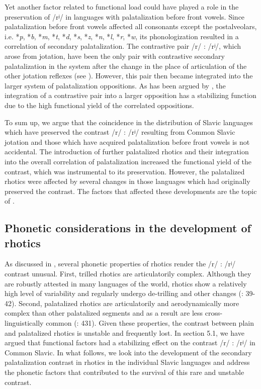 \documentclass[output=paper]{langscibook}
\begin{document}
Yet another factor related to functional load could have played a role in the preservation of /rʲ/ in languages with palatalization before front vowels. Since palatalization before front vowels affected all consonants except the postalveolars, i.e. *\textit{p}, *\textit{b}, *\textit{m}, *\textit{t}, *\textit{d}, *\textit{s}, *\textit{z}, *\textit{n}, *\textit{l}, *\textit{r}, *\textit{w}, its phonologization resulted in a correlation of secondary palatalization. The contrastive pair /r/ : /rʲ/, which arose from jotation, have been the only pair with contrastive secondary palatalization in the system after the change in the place of articulation of the other jotation reflexes (see ). However, this pair then became integrated into the larger system of palatalization oppositions. As has been argued by \citet[17-20]{Martinet1952}, the integration of a contrastive pair into a larger opposition has a stabilizing function due to the high functional yield of the correlated oppositions.


To sum up, we argue that the coincidence in the distribution of Slavic languages which have preserved the contrast /r/ : /rʲ/ resulting from Common Slavic jotation and those which have acquired palatalization before front vowels is not accidental. The introduction of further palatalized rhotics and their integration into the overall correlation of palatalization increased the functional yield of the contrast, which was instrumental to its preservation. However, the palatalized rhotics were affected by several changes in those languages which had originally preserved the contrast. The factors that affected these developments are the topic of .

\subsection{Phonetic considerations in the development of rhotics}
\label{sec:kavitskaya:5.2}
As discussed in , several phonetic properties of rhotics render the /r/ : /rʲ/ contrast unusual. First, trilled rhotics are articulatorily complex. Although they are robustly attested in many languages of the world, rhotics show a relatively high level of variability and regularly undergo de-trilling and other changes (\citealt{Jaworski2018}: 39-42). Second, palatalized rhotics are articulatorily and aerodynamically more complex than other palatalized segments and as a result are less cross-linguistically common (\citealt{Hall2000,NikolaevGrossman2020}: 431). Given these properties, the contrast between plain and palatalized rhotics is unstable and frequently lost. In section 5.1, we have argued that functional factors had a stabilizing effect on the contrast /r/ : /rʲ/ in Common Slavic. In what follows, we look into the development of the secondary palatalization contrast in rhotics in the individual Slavic languages and address the phonetic factors that contributed to the survival of this rare and unstable contrast.
\end{document}

